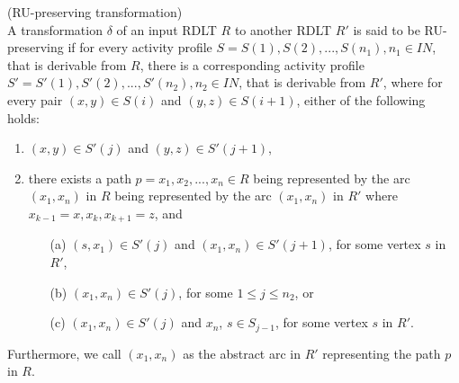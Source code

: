 \begin{defn} (RU-preserving transformation) \\
    A transformation $\delta$ of an input RDLT $R$ to another RDLT $R'$ is said to be RU-preserving if for every activity profile $S = {S(1), S(2), ..., S(n_1)}, n_1 \in IN$, that is derivable from $R$, there is a corresponding activity profile $S' = {S'(1), S'(2), ..., S'(n_2)}, n_2 \in IN$, that is derivable from $R'$, where for every pair $(x,y) \in S(i)$ and $(y,z) \in S(i+1)$, either of the following holds:
    \begin{enumerate}
        \item $(x,y) \in S'(j)$ and $(y,z) \in S'(j+1)$,
        \item there exists a path $p=x_1, x_2, ..., x_n \in R$ being represented by the arc $(x_1, x_n)$ in $R$ being represented by the arc $(x_1, x_n)$ in $R'$ where $x_{k-1}=x,x_k, x_{k+1}=z$, and
            \begin{itemize}
                \item[(a)] $(s,x_1) \in S'(j)$ and $(x_1,x_n) \in S'(j+1)$, for some vertex $s$ in $R'$,
                \item[(b)] $(x_1,x_n) \in S'(j)$, for some $1 \leq j \leq n_2$, or
                \item[(c)] $(x_1,x_n) \in S'(j)$ and $x_n$, $s \in S_{j-1}$, for some vertex $s$ in $R'$.
            \end{itemize}
    \end{enumerate}
    Furthermore, we call $(x_1,x_n)$ as the abstract arc in $R'$ representing the path $p$ in $R$.
\end{defn}
